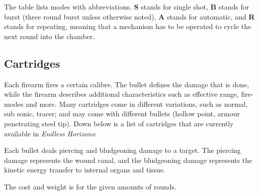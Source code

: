 The table lists modes with abbreviations. \textbf{S} stands for single shot,
\textbf{B} stands for burst (three round burst unless otherwise noted),
\textbf{A} stands for automatic, and \textbf{R} stands for repeating, meaning
that a mechanism has to be operated to cycle the next round into the chamber.

\subsection{Cartridges}
\label{sub:9-Cartridges}

Each firearm fires a certain calibre. The bullet defines the damage that is
done, while the firearm describes additional characteristics such as effective
range, fire-modes and more. Many cartridges come in different variations, such
as normal, sub sonic, tracer; and may come with different bullets (hollow
point, armour penetrating steel tip). Down below is a list of cartridges that
are currently available in \emph{Endless Horizons}:

Each bullet deals piercing and bludgeoning damage to a target. The piercing
damage represents the wound canal, and the bludgeoning damage represents the
kinetic energy transfer to internal organs and tissue.

The cost and weight is for the given amounts of rounds.


